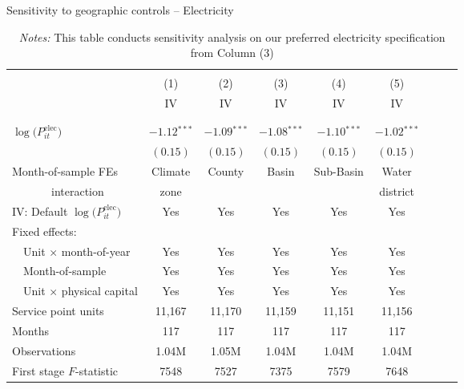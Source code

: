 \begin{table}[t!]\centering
\small
\caption{Sensitivity to geographic controls -- Electricity  \label{tab:elec_regs_month_int_fes}}
\vspace{-0.1cm}
\small
\begin{adjustbox}{center} 
\begin{tabular}{lcccccccc} 
\hline \hline
\vspace{-0.37cm}
\\
 & (1)  & (2)  & (3)  & (4)  & (5)   \\ 
[0.1em]
 & IV & IV & IV & IV & IV  \\
\vspace{-0.37cm}
\\
\cline{2-6}
\vspace{-0.27cm}
\\
 $\log\big(P^{\text{elec}}_{it}\big)$ ~ & $-1.12$$^{***}$  & $-1.09$$^{***}$ & $-1.08$$^{***}$ & $-1.10$$^{***}$ & $-1.02$$^{***}$ \\ 
& $(0.15)$ & $(0.15)$ & $(0.15)$ & $(0.15)$ & $(0.15)$  \\
[1.5em] 
Month-of-sample FEs & Climate & County & Basin  & Sub-Basin  &  Water  \\
~~~~~~~interaction & zone & & & & district \\ 
[1em] 
IV: Default $\log\big(P^{\text{elec}}_{it}\big)$  & Yes & Yes & Yes  & Yes  &  Yes \\
[1em] 
Fixed effects: \\
[0.1em] 
~~Unit $\times$ month-of-year  & Yes  & Yes  & Yes  & Yes  & Yes   \\ 
[0.1em] 
~~Month-of-sample  & Yes  & Yes  & Yes  & Yes  & Yes     \\ 
[0.1em] 
~~Unit $\times$ physical capital & Yes & Yes & Yes & Yes & Yes  \\
[1em] 
Service point units & 11,167 & 11,170 & 11,159 & 11,151 & 11,156   \\ 
[0.1em] 
Months  & 117 & 117 & 117 & 117 & 117  \\ 
[0.1em] 
Observations & 1.04M & 1.05M & 1.04M & 1.04M & 1.04M  \\ 
[0.1em] 
First stage $F$-statistic & 7548 & 7527 & 7375 & 7579 & 7648  \\ 
[0.15em]
\hline
\end{tabular}
\end{adjustbox}
\captionsetup{width=\textwidth}
\caption*{\scriptsize \emph{Notes:} This table conducts sensitivity analysis on our preferred electricity specification from Column (3) 
}
\end{table}
